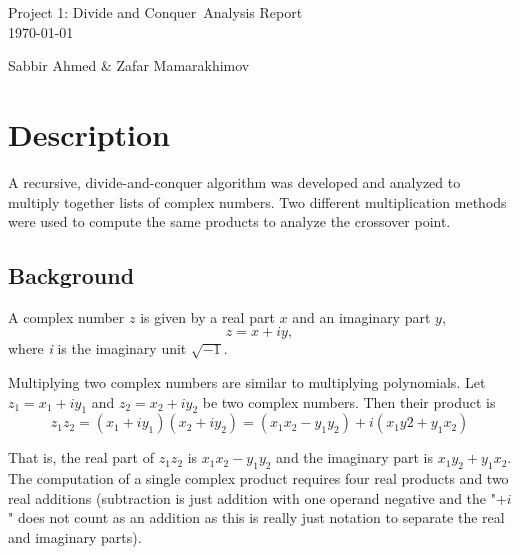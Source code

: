 \documentclass[usletter, 12pt]{article}
\newcommand{\project}{Project 1: Divide and Conquer}
\newcommand{\members}{Sabbir Ahmed \& Zafar Mamarakhimov}
\begin{document}
    \begin{titlepage}

        \vspace*{\fill} %
        \begin{center}

            {\LARGE \project~Analysis Report}\\ [1.5cm]

            \today
            
            \vspace*{\fill}

            \members

        \end{center}
        \vspace*{\fill} %

    \end{titlepage}

    \section{Description}
    A recursive, divide-and-conquer algorithm was developed and analyzed to multiply together lists of complex numbers. Two different multiplication methods were used to compute the same products to analyze the crossover point.

        \subsection{Background}
        A complex number $z$ is given by a real part $x$ and an imaginary part $y$,
            \[ z=x+iy, \]
        where \textit{i} is the imaginary unit $\sqrt{-1}$.

        Multiplying two complex numbers are similar to multiplying polynomials. Let $z_{1}=x_{1}+iy_{1}$ and $z_{2}=x_{2}+iy_{2}$ be two complex numbers. Then their product is
            \[ z_{1}z_{2}=(x_{1}+iy_{1})(x_{2}+iy_{2})=(x_{1}x_{2}-y_{1}y_{2})+i(x_{1}y2+y_{1}x_{2}) \]

        That is, the real part of $z_{1}z_{2}$ is $x_{1}x_{2}-y_{1}y_{2}$ and the imaginary part is $x_{1}y_{2}+y_{1}x_{2}$. The computation of a single complex product requires four real products and two real additions (subtraction is just addition with one operand negative and the "$+i$" does not count as an addition as this is really just notation to separate the real and imaginary parts).
\end{document}
